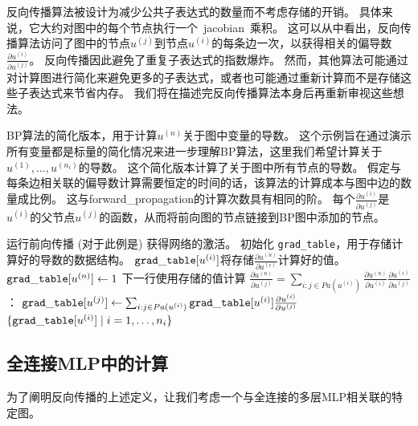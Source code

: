 
反向传播算法被设计为减少公共子表达式的数量而不考虑存储的开销。
具体来说，它大约对图中的每个节点执行一个~\gls{jacobian}~乘积。
这可以从中看出，反向传播算法访问了图中的节点$u^{(j)}$到节点$u^{(i)}$的每条边一次，以获得相关的偏导数$\frac{\partial u^{(i)}}{\partial u^{(j)}}$。
反向传播因此避免了重复子表达式的指数爆炸。
然而，其他算法可能通过对计算图进行简化来避免更多的子表达式，或者也可能通过重新计算而不是存储这些子表达式来节省内存。
我们将在描述完反向传播算法本身后再重新审视这些想法。
\begin{algorithm}[htb!]
\caption{\gls{BP}算法的简化版本，用于计算$u^{(n)}$关于图中变量的导数。
这个示例旨在通过演示所有变量都是标量的简化情况来进一步理解\gls{BP}算法，这里我们希望计算关于$u^{(1)},\ldots,u^{(n_i)}$的导数。
这个简化版本计算了关于图中所有节点的导数。
假定与每条边相关联的偏导数计算需要恒定的时间的话，该算法的计算成本与图中边的数量成比例。
这与\gls{forward_propagation}的计算次数具有相同的阶。
每个$\frac{\partial u^{(i)}}{\partial u^{(j)}}$是$u^{(i)}$的父节点$u^{(j)}$的函数，从而将前向图的节点链接到\gls{BP}图中添加的节点。}
\label{alg:bprop}
\begin{algorithmic}
\STATE 运行前向传播 (对于此例是) 获得网络的激活。
\STATE 初始化 {\tt grad\_table}，用于存储计算好的导数的数据结构。 ${\tt grad\_table}[u^{(i)}]$将存储$\frac{\partial u^{(n)}}{\partial u^{(i)}}$计算好的值。
\STATE ${\tt grad\_table}[u^{(n)}] \leftarrow 1$
\STATE 下一行使用存储的值计算 $\frac{\partial u^{(n)}}{\partial u^{(j)}} =
  \sum_{i: j \in Pa(u^{(i)})} \frac{\partial u^{(n)}}{\partial u^{(i)}} \frac{\partial u^{(i)}}{\partial u^{(j)}}$：
\STATE ${\tt grad\_table}[ u^{(j)}] \leftarrow 
\sum_{i: j \in Pa(u^{(i)})} {\tt grad\_table}[u^{(i)}]
\frac{\partial u^{(i)}}{\partial u^{(j)}}$
\ENDFOR
{} $\{ {\tt grad\_table}[ u^{(i)}] \mid i=1, \dots, n_i \} $
\end{algorithmic}
\end{algorithm}



\subsection{全连接MLP中的计算}
\label{sec:back_propagation_computation_in_fully_connected_mlp}

为了阐明反向传播的上述定义，让我们考虑一个与全连接的多层MLP相关联的特定图。

